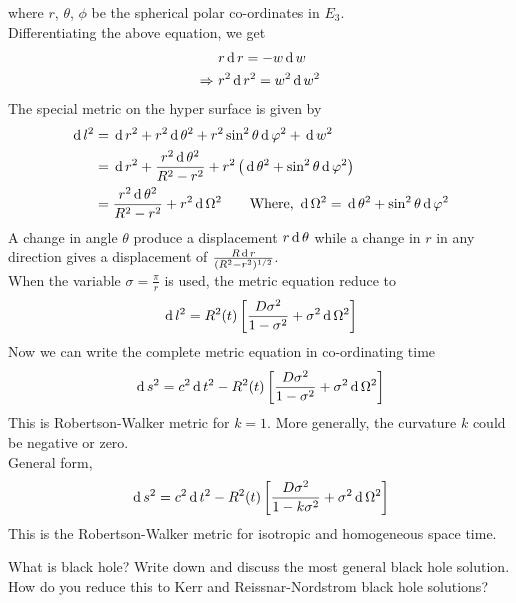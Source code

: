 \documentclass[../main-sheet.tex]{subfiles}
\begin{document}
\begin{soln}
where \(r\), \(\theta\), \(\phi\) be the spherical polar co-ordinates in \(E_3\).\\
Differentiating the above equation, we get
\begin{align}
    &r\,\mathrm{d}\, r=-w\,\mathrm{d}\, w\notag\\
    \Rightarrow\,\,&r^2 \,\mathrm{d}\, r^2=w^2\,\mathrm{d}\, w^2\label{eq:robert2}
\end{align}
The special metric on the hyper surface is given by
\begin{align*}
    \,\mathrm{d}\, l^2&=\,\mathrm{d}\, r^2 + r^2\,\mathrm{d}\, \theta^2 + r^2 \sin^2 \theta \,\mathrm{d}\, \varphi^2 + \,\mathrm{d}\, w^2\\
    &=\,\mathrm{d}\, r^2 + \frac{r^2\,\mathrm{d}\, \theta^2}{R^2-r^2} + r^2 \left(\,\mathrm{d}\, \theta^2+ \sin^2 \theta \,\mathrm{d}\, \varphi^2\right)\\
    &=\frac{r^2\,\mathrm{d}\, \theta^2}{R^2-r^2} + r^2 \,\mathrm{d}\,\Omega^2\qquad \text{Where, } \,\mathrm{d}\,\Omega^2=\,\mathrm{d}\,\theta^2+\sin^2\theta\,\mathrm{d}\, \varphi^2
\end{align*} 
A  change  in angle \(\theta\)	produce a displacement \(r\,\mathrm{d}\,\theta\) while a change in \(r\) in any
direction gives a displacement of \(\frac{R\,\mathrm{d}\, r }{(R^2-r^2)^{1/2}}\).\\
When the variable \(\sigma=\frac{\pi}{r }\)
is used, the metric equation reduce to
\[
    \,\mathrm{d}\, l^2=R^2(t)\left[\frac{D \sigma^2}{1-\sigma^2} + \sigma^2 \,\mathrm{d}\,\Omega^2\right]
\]
Now we can write the complete metric equation in co-ordinating time
\[
    \,\mathrm{d}\, s^2=c^2\,\mathrm{d}\, t^2-R^2(t)\left[\frac{D \sigma^2}{1-\sigma^2} + \sigma^2 \,\mathrm{d}\,\Omega^2\right]
    \]
    This is Robertson-Walker metric for \(k = 1\).
    More generally, the curvature \(k\) could be negative or zero.\\
    General form,
    \[
        \,\mathrm{d}\, s^2=c^2\,\mathrm{d}\, t^2-R^2(t)\left[\frac{D \sigma^2}{1-k\sigma^2} + \sigma^2 \,\mathrm{d}\,\Omega^2\right]
        \]
        This is the Robertson-Walker metric for isotropic and homogeneous space time.
\end{soln}
\begin{prob}
    What is black hole? Write down and discuss the most general black hole solution. How do you reduce this to Kerr and Reissnar-Nordstrom black hole solutions?
\end{prob}
\end{document}
